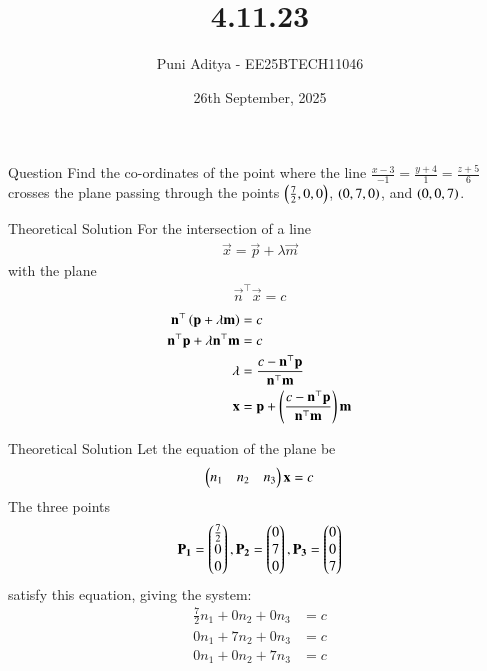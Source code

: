 \documentclass{beamer}
\title{4.11.23}
\date{26th September, 2025}
\author{Puni Aditya - EE25BTECH11046}
\begin{document}
\frame{\titlepage}
\begin{frame}{Question}
Find the co-ordinates of the point where the line $\frac{x-3}{-1} = \frac{y+4}{1} = \frac{z+5}{6}$ crosses the plane passing through the points $\left(\frac{7}{2}, 0, 0\right)$, $\left(0, 7, 0\right)$, and $\left(0, 0, 7\right)$.
\end{frame}

\begin{frame}{Theoretical Solution}
For the intersection of a line
\begin{align*}
    \vec{x} = \vec{p} + \lambda\vec{m}
\end{align*}    
with the plane
\begin{align*}
    \vec{n}^\top\vec{x} = c
\end{align*}
\begin{align}
    \mathbf{n}^\top\left(\mathbf{p}+\lambda\mathbf{m}\right) &= c \\
    \mathbf{n}^\top\mathbf{p} + \lambda\mathbf{n}^\top\mathbf{m} &= c \\
    \lambda &= \frac{c - \mathbf{n}^\top\mathbf{p}}{\mathbf{n}^\top\mathbf{m}} \label{eq:27} \\
    \mathbf{x} &= \mathbf{p} + \left(\frac{c - \mathbf{n}^\top\mathbf{p}}{\mathbf{n}^\top\mathbf{m}}\right)\mathbf{m} \label{eq:28}
\end{align}
\end{frame}

\begin{frame}{Theoretical Solution}
Let the equation of the plane be 
\begin{align}
\begin{pmatrix}n_1 & n_2 & n_3\end{pmatrix}\mathbf{x} = c \label{eq:1}
\end{align}
The three points 
\begin{align*}
    \mathbf{P_1} = \begin{pmatrix}\frac{7}{2} \\ 0 \\ 0\end{pmatrix}, \mathbf{P_2} = \begin{pmatrix}0 \\ 7 \\ 0\end{pmatrix}, \mathbf{P_3} = \begin{pmatrix}0 \\ 0 \\ 7\end{pmatrix}
\end{align*}
satisfy this equation, giving the system:
\begin{align}
    \frac{7}{2}n_1 + 0n_2 + 0n_3 &= c \\
    0n_1 + 7n_2 + 0n_3 &= c \\
    0n_1 + 0n_2 + 7n_3 &= c
\end{align}
\end{frame}
\end{document}

